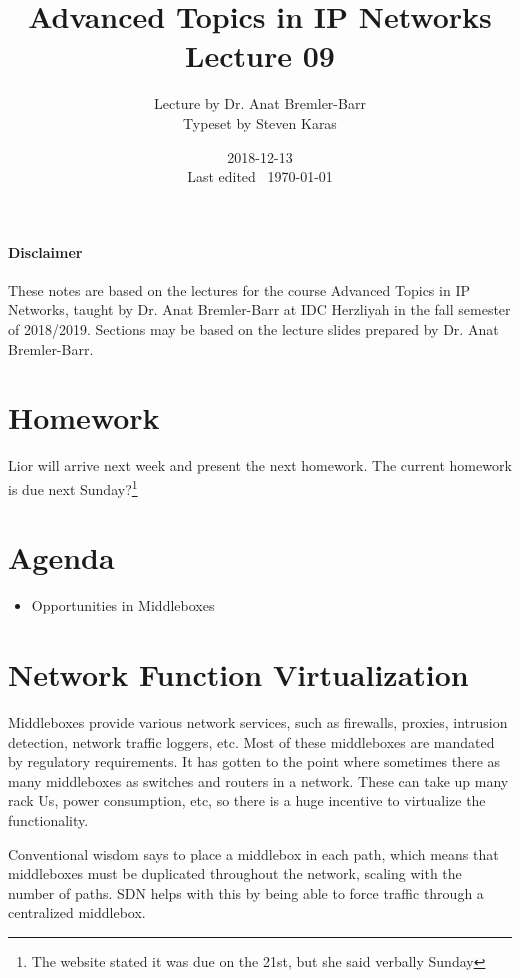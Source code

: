 \documentclass{idc_msc}
\title{Advanced Topics in IP Networks \\\large Lecture 09}
\date{2018-12-13 \\ Last edited \currenttime\ \today}
\author{Lecture by Dr. Anat Bremler-Barr\\Typeset by Steven Karas}
\begin{document}
\maketitle

\paragraph{Disclaimer}

These notes are based on the lectures for the course Advanced Topics in IP Networks, taught by Dr. Anat Bremler-Barr at IDC Herzliyah in the fall semester of 2018/2019.
Sections may be based on the lecture slides prepared by Dr. Anat Bremler-Barr.

\nocite{Varghese:2004:NAI:1203994}
\nocite{Crovella:2006:IMI:1196480}
\nocite{Kurose:2002:CNT:549735}

\section{Homework}

Lior will arrive next week and present the next homework.
The current homework is due next Sunday?\footnote{The website stated it was due on the 21st, but she said verbally Sunday}

\section{Agenda}

\begin{itemize}
  \item Opportunities in Middleboxes
\end{itemize}

\section{Network Function Virtualization}

Middleboxes provide various network services, such as firewalls, proxies, intrusion detection, network traffic loggers, etc.
Most of these middleboxes are mandated by regulatory requirements.
It has gotten to the point where sometimes there as many middleboxes as switches and routers in a network.
These can take up many rack Us, power consumption, etc, so there is a huge incentive to virtualize the functionality.

Conventional wisdom says to place a middlebox in each path, which means that middleboxes must be duplicated throughout the network, scaling with the number of paths.
SDN helps with this by being able to force traffic through a centralized middlebox.
\end{document}
